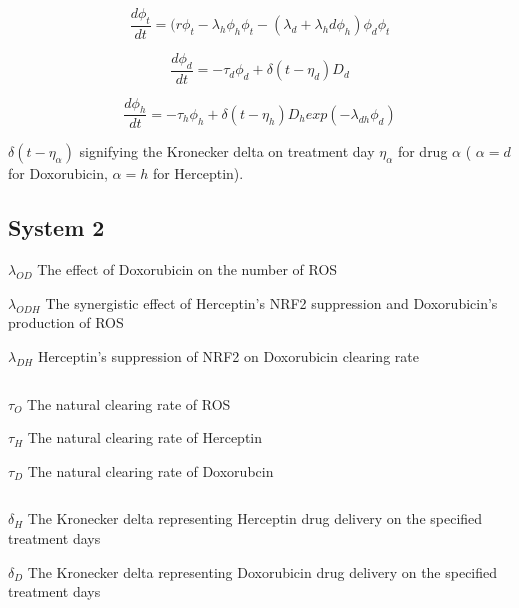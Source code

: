 \documentclass{article}
\begin{document}
$$ \frac{d \phi_t}{dt} = (r \phi_t - \lambda_h \phi_h \phi_t  - (\lambda_d + \lambda_hd \phi_h ) \phi_d \phi_t $$

$$ \frac{d \phi_d}{dt} = - \tau_d \phi_d + \delta (t - \eta_d) D_d $$

$$ \frac{d \phi_h}{dt} = - \tau_h \phi_h + \delta (t - \eta_h) D_h exp(-\lambda_{dh} \phi_d) $$



$ \delta(t-\eta_{\alpha}) $ signifying the Kronecker delta on treatment day $ \eta_{\alpha} $ for drug $ \alpha $ ( $ \alpha = d $ for Doxorubicin, $ \alpha = h $ for Herceptin).




\subsection{System 2}

















$ \lambda_{OD} $ The effect of Doxorubicin on the number of ROS

$ \lambda_{ODH} $ The synergistic effect of Herceptin's NRF2 suppression and Doxorubicin's production of ROS

$ \lambda_{DH} $ Herceptin's suppression of NRF2 on Doxorubicin clearing rate 

$$
\;
\;
$$


$ \tau_O $ The natural clearing rate of ROS

$ \tau_H $ The natural clearing rate of Herceptin

$ \tau_D $ The natural clearing rate of Doxorubcin

$$
\;
\;
$$


$ \delta_H $ The Kronecker delta representing Herceptin drug delivery on the specified treatment days

$ \delta_D $ The Kronecker delta representing Doxorubicin drug delivery on the specified treatment days
\end{document}
